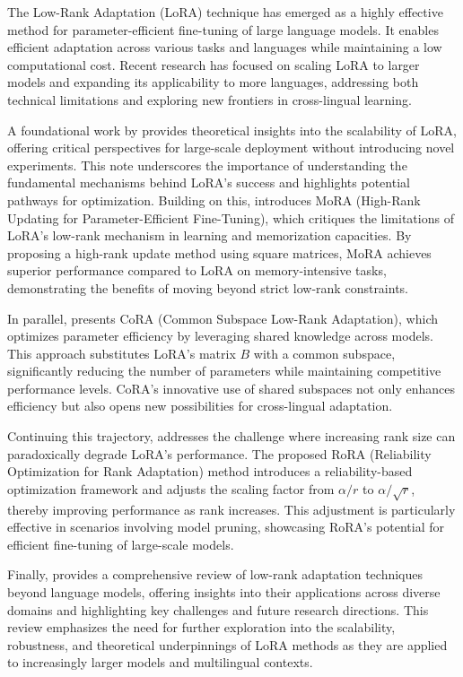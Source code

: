 \documentclass[conference]{IEEEtran}
\begin{document}
The Low-Rank Adaptation (LoRA) technique has emerged as a highly effective method for parameter-efficient fine-tuning of large language models. It enables efficient adaptation across various tasks and languages while maintaining a low computational cost. Recent research has focused on scaling LoRA to larger models and expanding its applicability to more languages, addressing both technical limitations and exploring new frontiers in cross-lingual learning.

A foundational work by \cite{a} provides theoretical insights into the scalability of LoRA, offering critical perspectives for large-scale deployment without introducing novel experiments. This note underscores the importance of understanding the fundamental mechanisms behind LoRA's success and highlights potential pathways for optimization. Building on this, \cite{b} introduces MoRA (High-Rank Updating for Parameter-Efficient Fine-Tuning), which critiques the limitations of LoRA's low-rank mechanism in learning and memorization capacities. By proposing a high-rank update method using square matrices, MoRA achieves superior performance compared to LoRA on memory-intensive tasks, demonstrating the benefits of moving beyond strict low-rank constraints.

In parallel, \cite{c} presents CoRA (Common Subspace Low-Rank Adaptation), which optimizes parameter efficiency by leveraging shared knowledge across models. This approach substitutes LoRA's matrix $B$ with a common subspace, significantly reducing the number of parameters while maintaining competitive performance levels. CoRA's innovative use of shared subspaces not only enhances efficiency but also opens new possibilities for cross-lingual adaptation.

Continuing this trajectory, \cite{d} addresses the challenge where increasing rank size can paradoxically degrade LoRA's performance. The proposed RoRA (Reliability Optimization for Rank Adaptation) method introduces a reliability-based optimization framework and adjusts the scaling factor from $\alpha/r$ to $\alpha/\sqrt{r}$, thereby improving performance as rank increases. This adjustment is particularly effective in scenarios involving model pruning, showcasing RoRA's potential for efficient fine-tuning of large-scale models.

Finally, \cite{e} provides a comprehensive review of low-rank adaptation techniques beyond language models, offering insights into their applications across diverse domains and highlighting key challenges and future research directions. This review emphasizes the need for further exploration into the scalability, robustness, and theoretical underpinnings of LoRA methods as they are applied to increasingly larger models and multilingual contexts.
\end{document}
